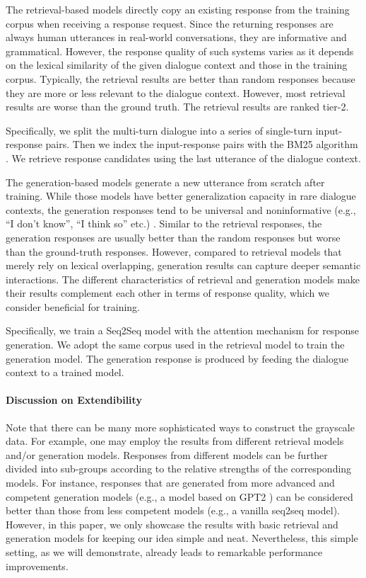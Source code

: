\documentclass[11pt,a4paper]{article}
\begin{document}
	The retrieval-based models \cite{ji2014information,hu2014convolutional}  directly copy an existing response from the training corpus when receiving a response request. Since the returning responses are always human utterances in real-world conversations, they are informative and grammatical. However, the response quality of such systems varies as it depends on the lexical similarity of the given dialogue context and those in the training corpus. Typically, the retrieval results are better than random responses because they are more or less relevant to the dialogue context. However, most retrieval results are worse than the ground truth. The retrieval results are ranked tier-2.
	
	Specifically, we split the multi-turn dialogue into a series of single-turn input-response pairs. Then we index the input-response pairs with the BM25 algorithm \cite{robertson2009probabilistic}. We retrieve response candidates using the last utterance of the dialogue context.
	
	The generation-based models \cite{shang2015neural,li-etal-2016-diversity} generate a new utterance from scratch after training. While those models have better generalization capacity in rare dialogue contexts, the generation responses tend to be universal and noninformative (e.g., “I don’t know”, “I think so” etc.) \cite{li-etal-2016-diversity}. Similar to the retrieval responses, the generation responses are usually better than the random responses but worse than the ground-truth responses. However, compared to retrieval models that merely rely on lexical overlapping, generation results can capture deeper semantic interactions. The different characteristics of retrieval and generation models make their results complement each other in terms of response quality, which we consider beneficial for training.
	
	Specifically, we train a Seq2Seq model with the attention mechanism \cite{bahdanau2015Neural} for response generation. We adopt the same corpus used in the retrieval model to train the generation model. The generation response is produced by feeding the dialogue context to a trained model.
	\paragraph{Discussion on Extendibility}
	Note that there can be many more sophisticated ways to construct the grayscale data. For example, one may employ the results from different retrieval models and/or generation models. Responses from different models can be further divided into sub-groups according to the relative strengths of the corresponding models. For instance, responses that are generated from more advanced and competent generation models (e.g., a model based on GPT2 \cite{radford2019language}) can be considered better than those from less competent models (e.g., a vanilla seq2seq model). However, in this paper,  we only showcase the results with basic retrieval and generation models for keeping our idea simple and neat. Nevertheless, this simple setting, as we will demonstrate, already leads to remarkable performance improvements.
\end{document}
